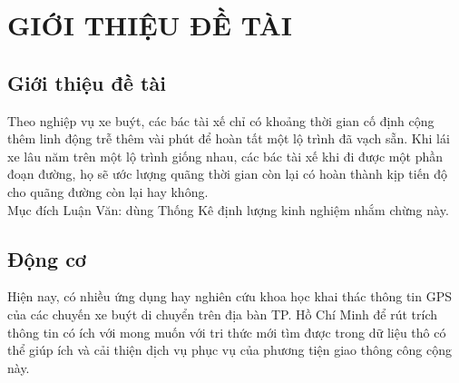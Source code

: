 \documentclass[a4paper, 13pt]{report}
\begin{document}
\chapter{GIỚI THIỆU ĐỀ TÀI} %
\section{Giới thiệu đề tài}
Theo nghiệp vụ xe buýt, các bác tài xế chỉ có khoảng thời gian cố định cộng thêm linh động trễ thêm vài phút để hoàn tất một lộ trình đã vạch sẵn. Khi lái xe lâu năm trên một lộ trình giống nhau, các bác tài xế khi đi được một phần đoạn đường, họ sẽ ước lượng quãng thời gian còn lại có hoàn thành kịp tiến độ cho quãng đường còn lại hay không.\\
Mục đích Luận Văn: dùng Thống Kê định lượng kinh nghiệm nhắm chừng này.\\

\section{Động cơ}
Hiện nay, có nhiều ứng dụng hay nghiên cứu khoa học khai thác thông tin GPS của các chuyến xe buýt di chuyển trên địa bàn TP. Hồ Chí Minh để rút trích thông tin có ích với mong muốn với tri thức mới tìm được trong dữ liệu thô có thể giúp ích và cải thiện dịch vụ phục vụ của phương tiện giao thông công cộng này.\\
\end{document}
